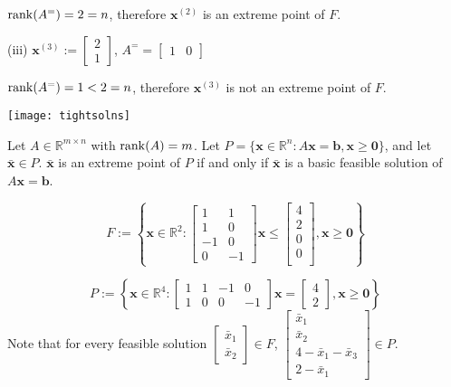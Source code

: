 $ \operatorname{rank}(A^=)=2=n $, therefore $\bm{x}^{(2)}$ is an extreme
point of $ F $.

(iii)
$\bm{x}^{(3)}:=\begin{bmatrix}2\\1\end{bmatrix}$,
$ A^= =
\begin{bmatrix}
    1 & 0
\end{bmatrix} $

$ \operatorname{rank}(A^=)=1<2=n $, therefore $\bm{x}^{(3)}$ is not an extreme
point of $ F $.

\begin{center}
    \texttt{[image: tightsolns]}
\end{center}

\begin{thmbox}
    \begin{theorem}
        Let $ A\in\mathbb{R}^{m\times n} $ with $ \operatorname{rank}(A)=m $. 
        Let $ P=\{\bm{x}\in\mathbb{R}^n: A \bm{x}=\bm{b},
        \bm{x}\geqslant  \bm{0}\} $, and let $ \bm{\bar{x}}\in P $.
        $ \bm{\bar{x}} $ is an extreme point of $ P $ if and only if $ \bm{\bar{x}} $ is a basic feasible
        solution of $  A \bm{x}=\bm{b} $.
    \end{theorem}
\end{thmbox}

\[ F:=\left\{ \bm{x}\in\mathbb{R}^2: \begin{bmatrix}
    1 & 1\\
    1 & 0\\
    -1 & 0\\
    0 & -1
\end{bmatrix}\bm{x}\le
\begin{bmatrix}
    4\\
    2\\
    0\\
    0\\
\end{bmatrix}, \bm{x}\geqslant  \bm{0} \right\} \]

\[ P:=\left\{\bm{x}\in\mathbb{R}^4:
\begin{bmatrix}
    1&1&-1&0\\
    1&0&0&-1
\end{bmatrix}\bm{x}=
\begin{bmatrix}
    4\\
    2
\end{bmatrix}, \bm{x}\geqslant  \bm{0}\right\} \]
Note that for every feasible solution
$ \begin{bmatrix}
    \bar{x}_1\\
    \bar{x}_2
\end{bmatrix}\in F $,
$ \begin{bmatrix}
    \bar{x}_1\\
    \bar{x}_2\\
    4-\bar{x}_1-\bar{x}_3\\
    2-\bar{x}_1
\end{bmatrix}\in P $.

